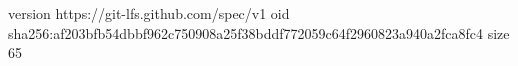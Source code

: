 version https://git-lfs.github.com/spec/v1
oid sha256:af203bfb54dbbf962c750908a25f38bddf772059c64f2960823a940a2fca8fc4
size 65
